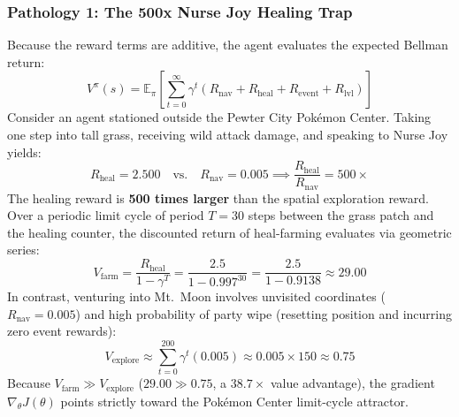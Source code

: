 \documentclass[conference]{IEEEtran}
\begin{document}
\subsubsection{Pathology 1: The 500x Nurse Joy Healing Trap}
Because the reward terms are additive, the agent evaluates the expected Bellman return:
\begin{equation}
V^\pi(s) = \mathbb{E}_\pi \left[ \sum_{t=0}^\infty \gamma^t \left( R_{\text{nav}} + R_{\text{heal}} + R_{\text{event}} + R_{\text{lvl}} \right) \right]
\end{equation}
Consider an agent stationed outside the Pewter City Pok{\'e}mon Center. Taking one step into tall grass, receiving wild attack damage, and speaking to Nurse Joy yields:
\begin{equation}
R_{\text{heal}} = 2.500 \quad \text{vs.} \quad R_{\text{nav}} = 0.005 \implies \frac{R_{\text{heal}}}{R_{\text{nav}}} = 500\times
\end{equation}
The healing reward is \textbf{500 times larger} than the spatial exploration reward. Over a periodic limit cycle of period $T = 30$ steps between the grass patch and the healing counter, the discounted return of heal-farming evaluates via geometric series:
\begin{equation}
V_{\text{farm}} = \frac{R_{\text{heal}}}{1 - \gamma^T} = \frac{2.5}{1 - 0.997^{30}} = \frac{2.5}{1 - 0.9138} \approx 29.00
\end{equation}
In contrast, venturing into Mt.~Moon involves unvisited coordinates ($R_{\text{nav}} = 0.005$) and high probability of party wipe (resetting position and incurring zero event rewards):
\begin{equation}
V_{\text{explore}} \approx \sum_{t=0}^{200} \gamma^t (0.005) \approx 0.005 \times 150 \approx 0.75
\end{equation}
Because $V_{\text{farm}} \gg V_{\text{explore}}$ ($29.00 \gg 0.75$, a $38.7\times$ value advantage), the gradient $\nabla_\theta J(\theta)$ points strictly toward the Pok{\'e}mon Center limit-cycle attractor.
\end{document}
